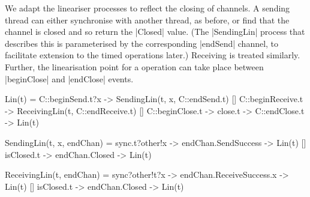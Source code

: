 We adapt the lineariser processes to reflect the closing of channels.  A
sending thread can either synchronise with another thread, as before, or find
that the channel is closed and so return the |Closed| value.  (The
|SendingLin| process that describes this is parameterised by the corresponding
|endSend| channel, to facilitate extension to the timed operations later.)
Receiving is treated similarly.  Further, the linearisation point for a
 operation can take place between |beginClose| and |endClose|
events.
%
\begin{cspm}
Lin(t) = 
  C::beginSend.t?x -> SendingLin(t, x, C::endSend.t)
  [] C::beginReceive.t -> ReceivingLin(t, C::endReceive.t)
  [] C::beginClose.t -> close.t -> C::endClose.t -> Lin(t)

SendingLin(t, x, endChan) = 
  sync.t?other!x -> endChan.SendSuccess -> Lin(t)
  [] isClosed.t -> endChan.Closed -> Lin(t)

ReceivingLin(t, endChan) =  
  sync?other!t?x -> endChan.ReceiveSuccess.x -> Lin(t)
  [] isClosed.t -> endChan.Closed -> Lin(t)
\end{cspm}


